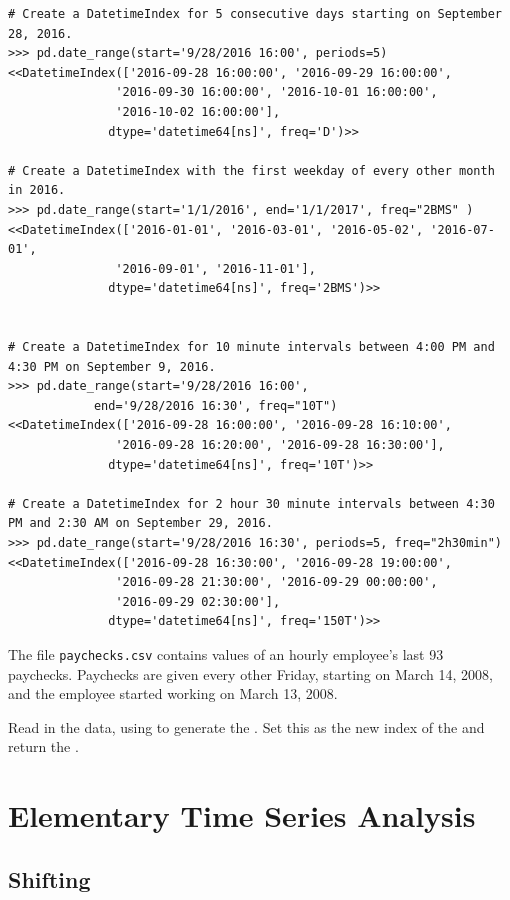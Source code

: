 \begin{lstlisting}
# Create a DatetimeIndex for 5 consecutive days starting on September 28, 2016.
>>> pd.date_range(start='9/28/2016 16:00', periods=5)
<<DatetimeIndex(['2016-09-28 16:00:00', '2016-09-29 16:00:00',
               '2016-09-30 16:00:00', '2016-10-01 16:00:00',
               '2016-10-02 16:00:00'],
              dtype='datetime64[ns]', freq='D')>>

# Create a DatetimeIndex with the first weekday of every other month in 2016.
>>> pd.date_range(start='1/1/2016', end='1/1/2017', freq="2BMS" )
<<DatetimeIndex(['2016-01-01', '2016-03-01', '2016-05-02', '2016-07-01',
               '2016-09-01', '2016-11-01'],
              dtype='datetime64[ns]', freq='2BMS')>>


# Create a DatetimeIndex for 10 minute intervals between 4:00 PM and 4:30 PM on September 9, 2016.
>>> pd.date_range(start='9/28/2016 16:00',
            end='9/28/2016 16:30', freq="10T")
<<DatetimeIndex(['2016-09-28 16:00:00', '2016-09-28 16:10:00',
               '2016-09-28 16:20:00', '2016-09-28 16:30:00'],
              dtype='datetime64[ns]', freq='10T')>>

# Create a DatetimeIndex for 2 hour 30 minute intervals between 4:30 PM and 2:30 AM on September 29, 2016.
>>> pd.date_range(start='9/28/2016 16:30', periods=5, freq="2h30min")
<<DatetimeIndex(['2016-09-28 16:30:00', '2016-09-28 19:00:00',
               '2016-09-28 21:30:00', '2016-09-29 00:00:00',
               '2016-09-29 02:30:00'],
              dtype='datetime64[ns]', freq='150T')>>
\end{lstlisting}

\begin{problem} %
The file \texttt{paychecks.csv} contains values of an hourly employee's last 93 paychecks.
Paychecks are given every other Friday, starting on March 14, 2008, and the employee started working on March 13, 2008.

Read in the data, using  to generate the .
Set this as the new index of the  and return the .
\end{problem}

\section*{Elementary Time Series Analysis}
\subsection*{Shifting}

